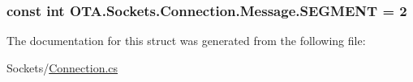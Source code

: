 \subsubsection[{S\+E\+G\+M\+E\+N\+T}]{\setlength{\rightskip}{0pt plus 5cm}const int O\+T\+A.\+Sockets.\+Connection.\+Message.\+S\+E\+G\+M\+E\+N\+T = 2}\label{struct_o_t_a_1_1_sockets_1_1_connection_1_1_message_af20ae85bb9f636f5a38d0a0dbd66f1fe}


The documentation for this struct was generated from the following file\+:\begin{DoxyCompactItemize}
\item 
Sockets/\hyperlink{_connection_8cs}{Connection.\+cs}\end{DoxyCompactItemize}
